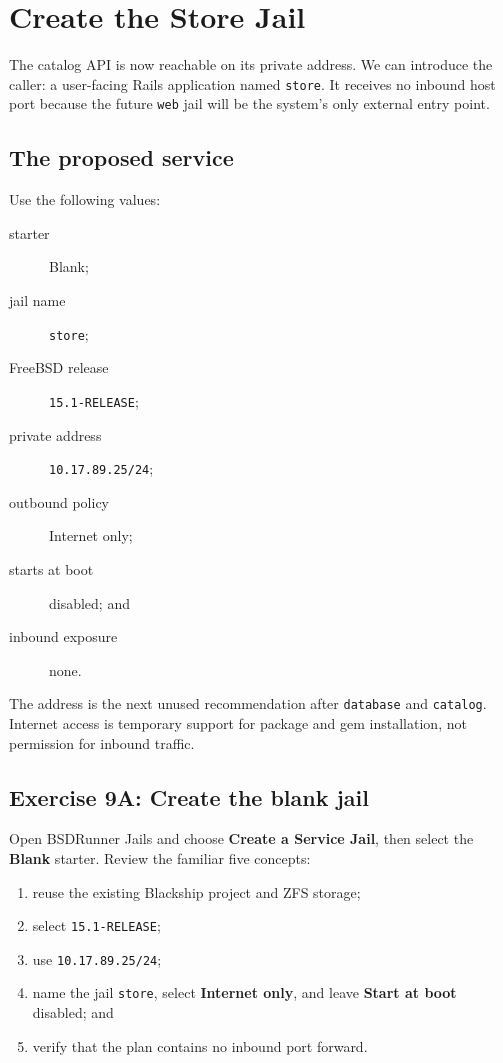 \chapter{Create the Store Jail}

The catalog API is now reachable on its private address. We can introduce the
caller: a user-facing Rails application named \texttt{store}. It receives no
inbound host port because the future \texttt{web} jail will be the system's
only external entry point.

\section{The proposed service}

Use the following values:

\begin{description}
  \item[starter] Blank;
  \item[jail name] \texttt{store};
  \item[FreeBSD release] \texttt{15.1-RELEASE};
  \item[private address] \texttt{10.17.89.25/24};
  \item[outbound policy] Internet only;
  \item[starts at boot] disabled; and
  \item[inbound exposure] none.
\end{description}

The address is the next unused recommendation after \texttt{database} and
\texttt{catalog}. Internet access is temporary support for package and gem
installation, not permission for inbound traffic.

\section{Exercise 9A: Create the blank jail}

Open BSDRunner Jails and choose \textbf{Create a Service Jail}, then select the
\textbf{Blank} starter. Review the familiar five concepts:

\begin{enumerate}
  \item reuse the existing Blackship project and ZFS storage;
  \item select \texttt{15.1-RELEASE};
  \item use \texttt{10.17.89.25/24};
  \item name the jail \texttt{store}, select \textbf{Internet only}, and leave
    \textbf{Start at boot} disabled; and
  \item verify that the plan contains no inbound port forward.
\end{enumerate}

